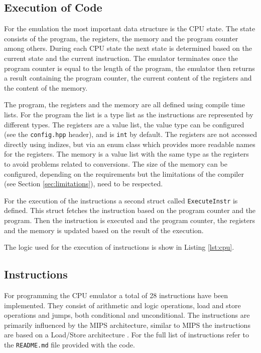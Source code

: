 
\subsection{Execution of Code}
For the emulation the most important data structure is the CPU state. The state consists of the program, the registers,
the memory and the program counter among others. During each CPU state the next state is determined based on the 
current state and the current instruction.
The emulator terminates once the program counter is equal to the length of the program,
the emulator then returns a result containing the program counter, the current content
of the registers and the content of the memory.

The program, the registers and the memory are all defined using  compile time lists.
For the program the list is a type list as the instructions are represented by different
types. The registers are a value list, the value type can be configured (see the
\texttt{config.hpp} header), and is \lstinline{int} by default. The registers are not
accessed directly using indizes, but via an enum class which provides
more readable names for the registers. The memory is a value list with the same type
as the registers to avoid problems related to conversions. The size of the memory
can be configured, depending on the requirements but the limitations of the compiler 
(see Section \ref{sec:limitations}), need to be respected.

For the execution of the instructions a second struct called \lstinline{ExecuteInstr} is defined. 
This struct fetches the instruction based on the program counter and the program. Then
the instruction is executed and the program counter, the registers and the memory is
updated based on the result of the execution.

The logic used for the execution of instructions is show in Listing \ref{lst:cpu}.



\subsection{Instructions}
For programming the CPU emulator a total of 28 instructions have been implemented. They consist of arithmetic and logic
operations, load and store operations and jumps, both conditional and unconditional. The instructions are primarily 
influenced by the MIPS architecture, similar to MIPS the instructions are based
on a Load/Store architecture \cite{mips}. For the full list of instructions refer to the \texttt{README.md} file provided with the code. 

